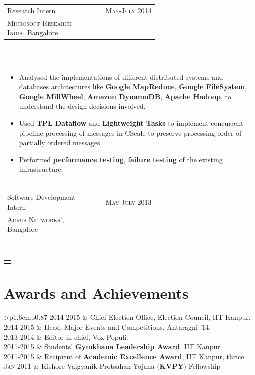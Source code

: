 \documentclass[a4paper]{article} %
\newcommand{\verticalspacing}{-0.25cm}
\newcommand{\bulletspace}{0.7cm}
\newcommand{\projectheadspacing}{6.9cm}
\newcommand{\cproject}[5]{%
    \begin{tabular}{p{0.60\linewidth}r}
        \textcolor{NavyBlue}{\small #2} & \multicolumn{1}{m{ \projectheadspacing{} }}{\raggedleft \small {\textsc{#1}}}\\
        \small {#3} & \small {#4}
    \end{tabular}\\
    \begin{tabular}{p{0.98\linewidth}}
    \vspace{-0.3cm}
        \small{#5}
    \end{tabular}
    \vspace{\verticalspacing{}}
}
\newcommand{\itemlist}[1]{%
    \def\arraystretch{1.2}
    \begin{tabular}{>{\raggedleft}p{1.6cm}p{0.87\linewidth}}
        #1
    \end{tabular}
    \def\arraystretch{1.0}
}
\begin{document}
\cproject
      {May-July 2014}
      {Research Intern}
      {\textsc{Microsoft Research India}, Bangalore}
      {}
      {%
          \begin{itemize}[leftmargin=\bulletspace{}]
              \item Analysed the implementations of different distributed systems and databases architectures like
                  \textbf{Google MapReduce}, \textbf{Google FileSystem}, \textbf{Google MillWheel},
                  \textbf{Amazon DynamoDB}, \textbf{Apache Hadoop}, to understand the design decisions involved.
              \item Used \textbf{TPL Dataflow} and \textbf{Lightweight Tasks} to implement concurrent pipeline
                  processing of messages in CScale to preserve processing order of partially ordered messages.
              \item Performed \textbf{performance testing}, \textbf{failure testing} of the existing infrastructure.
          \end{itemize}
     }

\cproject
    {May-July 2013}
    {Software Development Intern}
    {\textsc{Aurus Networks'}, Bangalore}
    {}
    {}

\vspace{-0.35cm}
\section{Awards and Achievements}

\itemlist {%
    \textsc{\small 2014-2015}   & Chief Election Office, Election Council, IIT Kanpur. \\
    \textsc{\small 2014-2015}   & Head, Major Events and Competitions, Antaragni '14. \\
    \textsc{\small 2013-2014}   & Editor-in-chief, Vox Populi. \\
    \textsc{\small 2011-2015}   & Students' \textbf{Gymkhana Leadership Award}, IIT Kanpur. \\
    \textsc{\small 2011-2015}   & Recipient of \textbf{Academic Excellence Award}, IIT Kanpur, thrice. \\
    \textsc{\small Jan 2011}    & Kishore Vaigyanik Protsahan Yojana (\textbf{KVPY}) Fellowship \\
}
\end{document}
